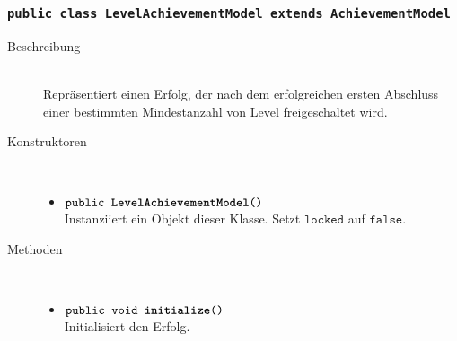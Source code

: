 \subsubsection{\normalfont \texttt{public class \textbf{LevelAchievementModel} extends AchievementModel}}

\begin{description}
\item[Beschreibung] \hfill \\ Repräsentiert einen Erfolg, der nach dem erfolgreichen ersten Abschluss einer bestimmten Mindestanzahl von Level freigeschaltet wird.
	
\item[Konstruktoren] \hfill \\
	\vspace{-.8cm}
	\begin{itemize}
		\item $\texttt{public \textbf{LevelAchievementModel}()}$ \\ Instanziiert ein Objekt dieser Klasse. Setzt $\texttt{locked}$ auf $\texttt{false}$.
	\end{itemize}
	
\item[Methoden] \hfill \\
	\vspace{-.8cm}
	\begin{itemize}
		\item $\texttt{public void \textbf{initialize}()}$ \\ Initialisiert den Erfolg.
		

\end{itemize}
\end{description}
